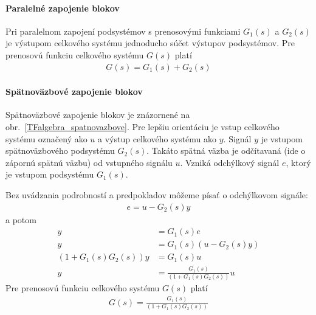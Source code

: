 \documentclass[a4paper, 10pt, ]{article}
\begin{document}
\paragraph{Paralelné zapojenie blokov}

\begin{center}

    \makebox[\textwidth][c]{%
    
    }

	\label{TFalgebra_paralelne}

\end{center}

Pri paralelnom zapojení podsystémov s prenosovými funkciami $G_1(s)$ a $G_2(s)$ je výstupom celkového systému jednoducho súčet výstupov podsystémov. Pre prenosovú funkciu celkového systému $G(s)$ platí
\begin{align}
    G(s) = G_1(s) + G_2(s)
\end{align}



\paragraph{Spätnoväzbové zapojenie blokov}

Spätnoväzbové zapojenie blokov je znázornené na obr.~\ref{TFalgebra_spatnovazbove}. Pre lepšiu orientáciu je vstup celkového systému označený ako $u$ a výstup celkového systému ako $y$. Signál $y$ je vstupom spätnoväzbového podsystému $G_2(s)$. Takáto spätná väzba je odčítavaná (ide o zápornú spätnú väzbu) od vstupného signálu $u$. Vzniká odchýlkový signál $e$, ktorý je vstupom podsystému $G_1(s)$.


\begin{center}

    \makebox[\textwidth][c]{%
    
    }

	\label{TFalgebra_spatnovazbove}

\end{center}

Bez uvádzania podrobností a predpokladov môžeme písať o odchýlkovom signále:
\begin{align}
    e = u - G_2(s) y
\end{align}
a potom
\begin{subequations}
    \begin{align}
        y &= G_1(s) e \\
        y &= G_1(s) \left( u - G_2(s) y \right) \\
        \left( 1 + G_1(s)G_2(s) \right) y &= G_1(s) u  \\
        y &= \frac{G_1(s)}{\left( 1 + G_1(s)G_2(s) \right)} u
    \end{align}
\end{subequations}
Pre prenosovú funkciu celkového systému $G(s)$ platí
\begin{align}
   G(s) = \frac{G_1(s)}{\left( 1 + G_1(s)G_2(s) \right)}
\end{align}





\end{document}
